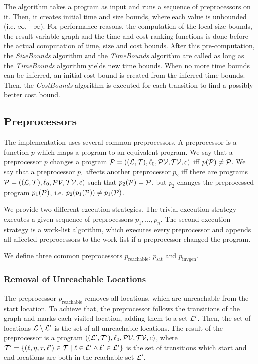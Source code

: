 The algorithm takes a program as input and runs a sequence of preprocessors on it.
Then, it creates initial time and size bounds, where each value is unbounded (i.e. $\infty, -\infty$).
For performance reasons, the computation of the local size bounds, the result variable graph and the time and cost ranking functions is done before the actual computation of time, size and cost bounds.
After this pre-computation, the \emph{SizeBounds} algorithm and the \emph{TimeBounds} algorithm are called as long as the \emph{TimeBounds} algorithm yields new time bounds.
When no more time bounds can be inferred, an initial cost bound is created from the inferred time bounds.
Then, the \emph{CostBounds} algorithm is executed for each transition to find a possibly better cost bound.

\subsection{Preprocessors}

The implementation uses several common preprocessors.
A preprocessor is a function $p$ which maps a program to an equivalent program.
We say that a preprocessor $p$ changes a program $\mathcal{P} = ((\mathcal{L}, \mathcal{T}), \ell_0, \mathcal{PV}, \mathcal{TV}, c)$ iff $p(\mathcal{P}) \neq \mathcal{P}$.
We say that a preprocessor $p_1$ affects another preprocessor $p_2$ iff there are programs $\mathcal{P} = ((\mathcal{L}, \mathcal{T}), \ell_0, \mathcal{PV}, \mathcal{TV}, c)$ such that $p_2(\mathcal{P}) = \mathcal{P}$, but $p_2$ changes the preprocessed program $p_1(\mathcal{P})$, i.e. $p_2(p_1(\mathcal{P})) \neq p_1(\mathcal{P})$.

We provide two different execution strategies.
The trivial execution strategy executes a given sequence of preprocessors $p_1, \dots, p_n$.
The second execution strategy is a work-list algorithm, which executes every preprocessor and appends all affected preprocessors to the work-list if a preprocessor changed the program.

We define three common preprocessors $p_{\text{reachable}}$, $p_{\text{sat}}$ and $p_{\text{invgen}}$.

\subsubsection{Removal of Unreachable Locations}

The preprocessor $p_{\text{reachable}}$ removes all locations, which are unreachable from the start location.
To achieve that, the preprocessor follows the transitions of the graph and marks each visited location, adding them to a set $\mathcal{L}'$.
Then, the set of locations $\mathcal{L} \setminus \mathcal{L}'$ is the set of all unreachable locations.
The result of the preprocessor is a program $((\mathcal{L}', \mathcal{T}'), \ell_0, \mathcal{PV}, \mathcal{TV}, c)$, where $\mathcal{T}' = \lbrace (\ell,\eta,\tau,\ell') \in \mathcal{T} \mid \ell \in \mathcal{L}' \wedge \ell' \in \mathcal{L}' \rbrace$ is the set of transitions which start and end locations are both in the reachable set $\mathcal{L}'$.

